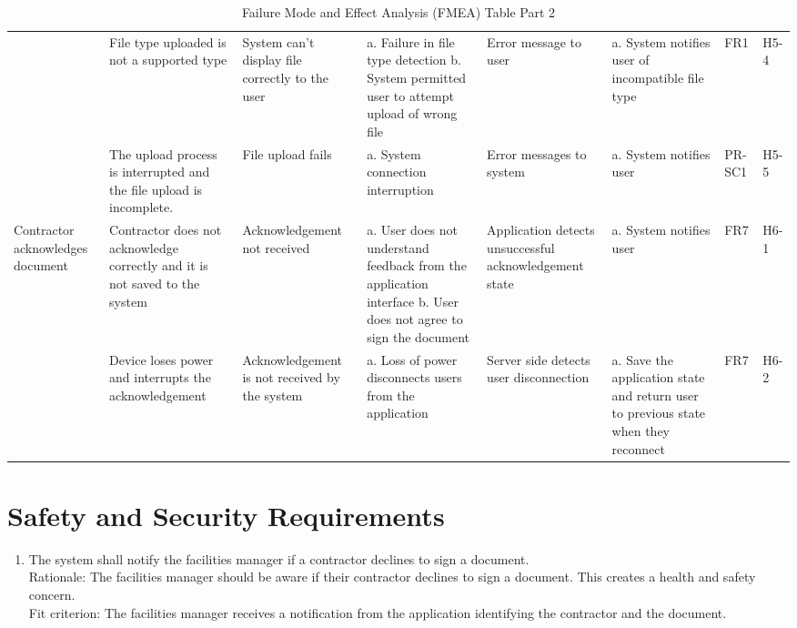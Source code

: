 \documentclass{article}
\begin{document}
\begin{table}[H]
{\begin{tabular}{|>{\raggedright}p{2.0cm}|>{\raggedright}p{2.0cm}|>{\raggedright}p{2.6cm}|>{\raggedright}p{4cm}|>{\raggedright}p{3cm}|>{\raggedright}p{4cm}|>{\raggedright}p{1.5cm}|p{1.5cm}|}
      & File type uploaded is not a supported type & System can't display
      file correctly to the user & a. Failure in file type detection
      \newline b. System permitted user to attempt upload of wrong file &
      Error message to user& a. System notifies user of incompatible file type &
      FR1 & H5-4 \\
      \cline{2-8}
      & The upload process is interrupted and the file upload is incomplete. &
      File upload fails & a. System connection interruption &
      Error messages to system& a. System notifies user & PR-SC1 & H5-5\\
      \hline
      Contractor acknowledges document & Contractor does not acknowledge
      correctly and it is not saved to the system & Acknowledgement not received
      & a. User does not understand feedback from the application interface
      \newline b. User does not agree to sign the document & Application detects
      unsuccessful acknowledgement state & a. System notifies user &
      FR7 & H6-1 \\
      \cline{2-8}
      & Device loses power and interrupts the acknowledgement & Acknowledgement
      is not received by the system &
      a. Loss of power disconnects users from the application & Server side
      detects user disconnection & a. Save the application state and return
      user to previous state when they reconnect & FR7 & H6-2 \\
      \hline
    \end{tabular}
  }
  \caption{Failure Mode and Effect Analysis (FMEA) Table Part 2}
\end{table}

\section{Safety and Security Requirements}

\begin{enumerate}[{SR-S}1.]
  \item The system shall notify the facilities manager if a contractor declines
    to sign a document.\\
    \newline Rationale: The facilities manager should be aware if
    their contractor
    declines to sign a document. This creates a health and safety concern.\\
    \newline Fit criterion: The facilities manager receives a
    notification from the
    application identifying the contractor and the document.
\end{enumerate}
\end{document}
